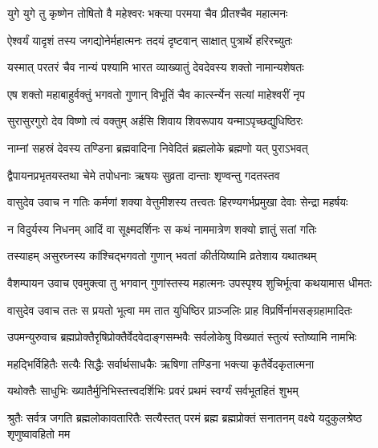 \twolineshloka
{युगे युगे तु कृष्णेन तोषितो वै महेश्वरः}%
{भक्त्या परमया चैव प्रीतश्चैव महात्मनः}%

\twolineshloka
{ऐश्वर्यं यादृशं तस्य जगद्योनेर्महात्मनः}%
{तदयं दृष्टवान् साक्षात् पुत्रार्थे हरिरच्युतः}%

\twolineshloka
{यस्मात् परतरं चैव नान्यं पश्यामि भारत}%
{व्याख्यातुं देवदेवस्य शक्तो नामान्यशेषतः}%

\twolineshloka
{एष शक्तो महाबाहुर्वक्तुं भगवतो गुणान्}%
{विभूतिं चैव कार्त्स्न्येन सत्यां माहेश्वरीं नृप}%

\twolineshloka
{सुरासुरगुरो देव विष्णो त्वं वक्तुम् अर्हसि}%
{शिवाय शिवरूपाय यन्माऽपृच्छद्युधिष्ठिरः}%

\twolineshloka
{नाम्नां सहस्रं देवस्य तण्डिना ब्रह्मवादिना}%
{निवेदितं ब्रह्मलोके ब्रह्मणो यत् पुराऽभवत्}%

\twolineshloka
{द्वैपायनप्रभृतयस्तथा चेमे तपोधनाः}%
{ऋषयः सुव्रता दान्ताः शृण्वन्तु गदतस्तव}%


वासुदेव उवाच
\twolineshloka
{न गतिः कर्मणां शक्या वेत्तुमीशस्य तत्त्वतः}%
{हिरण्यगर्भप्रमुखा देवाः सेन्द्रा महर्षयः}%

\twolineshloka
{न विदुर्यस्य निधनम् आदिं वा सूक्ष्मदर्शिनः}%
{स कथं नाममात्रेण शक्यो ज्ञातुं सतां गतिः}%

\twolineshloka
{तस्याहम् असुरघ्नस्य कांश्चिद्भगवतो गुणान्}%
{भवतां कीर्तयिष्यामि व्रतेशाय यथातथम्}%

वैशम्पायन उवाच
\twolineshloka
{एवमुक्त्वा तु भगवान् गुणांस्तस्य महात्मनः}%
{उपस्पृश्य शुचिर्भूत्वा कथयामास धीमतः}%

वासुदेव उवाच
\twolineshloka
{ततः स प्रयतो भूत्वा मम तात युधिष्ठिर}%
{प्राञ्जलिः प्राह विप्रर्षिर्नामसङ्ग्रहामादितः}%

उपमन्युरुवाच
\twolineshloka
{ब्रह्मप्रोक्तैरृषिप्रोक्तैर्वेदवेदाङ्गसम्भवैः}%
{सर्वलोकेषु विख्यातं स्तुत्यं स्तोष्यामि नामभिः}%

\twolineshloka
{महद्भिर्विहितैः सत्यैः सिद्धैः सर्वार्थसाधकैः}%
{ऋषिणा तण्डिना भक्त्या कृतैर्वेदकृतात्मना}%

\twolineshloka
{यथोक्तैः साधुभिः ख्यातैर्मुनिभिस्तत्त्वदर्शिभिः}%
{प्रवरं प्रथमं स्वर्ग्यं सर्वभूतहितं शुभम्}%

\threelineshloka
{श्रुतैः सर्वत्र जगति ब्रह्मलोकावतारितैः}
{सत्यैस्तत् परमं ब्रह्म ब्रह्मप्रोक्तं सनातनम्}%
{वक्ष्ये यदुकुलश्रेष्ठ शृणुष्वावहितो मम}%

